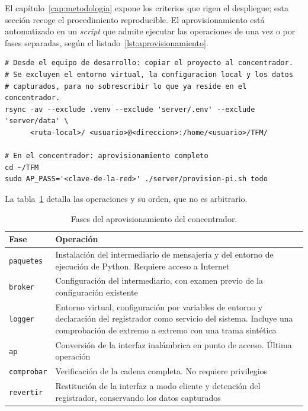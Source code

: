 El capítulo~\ref{cap:metodologia} expone los criterios que rigen el despliegue; esta sección
recoge el procedimiento reproducible. El aprovisionamiento está automatizado en un
\textit{script} que admite ejecutar las operaciones de una vez o por fases separadas, según
el listado~\ref{lst:aprovisionamiento}.

\begin{lstlisting}[caption={Aprovisionamiento completo del concentrador.}, label={lst:aprovisionamiento}]
# Desde el equipo de desarrollo: copiar el proyecto al concentrador.
# Se excluyen el entorno virtual, la configuracion local y los datos
# capturados, para no sobrescribir lo que ya reside en el concentrador.
rsync -av --exclude .venv --exclude 'server/.env' --exclude 'server/data' \
      <ruta-local>/ <usuario>@<direccion>:/home/<usuario>/TFM/

# En el concentrador: aprovisionamiento completo
cd ~/TFM
sudo AP_PASS='<clave-de-la-red>' ./server/provision-pi.sh todo
\end{lstlisting}

La tabla~\ref{table:fases-aprovisionamiento} detalla las operaciones y su orden, que no es
arbitrario.

\begin{table}[ht!]
\caption{Fases del aprovisionamiento del concentrador.}
\label{table:fases-aprovisionamiento}
\centering
\begin{tabular}{|p{2.1cm}|p{10.4cm}|}
\hline
\textbf{Fase} & \textbf{Operación} \\
\hline
\texttt{paquetes} & Instalación del intermediario de mensajería y del entorno de ejecución
de Python. Requiere acceso a Internet \\
\hline
\texttt{broker} & Configuración del intermediario, con examen previo de la configuración
existente \\
\hline
\texttt{logger} & Entorno virtual, configuración por variables de entorno y declaración del
registrador como servicio del sistema. Incluye una comprobación de extremo a extremo con una
trama sintética \\
\hline
\texttt{ap} & Conversión de la interfaz inalámbrica en punto de acceso. Última operación \\
\hline
\texttt{comprobar} & Verificación de la cadena completa. No requiere privilegios \\
\hline
\texttt{revertir} & Restitución de la interfaz a modo cliente y detención del registrador,
conservando los datos capturados \\
\hline
\end{tabular}
\end{table}

